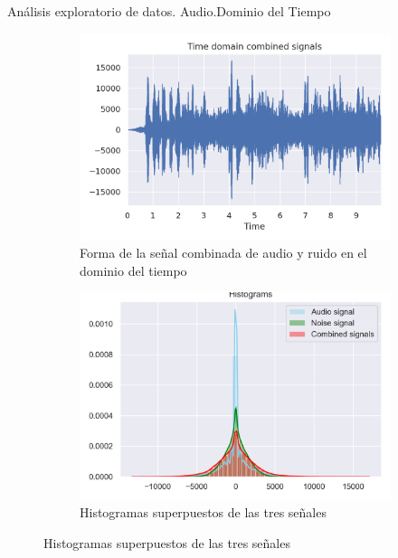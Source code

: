 \begin{frame}{Análisis exploratorio de datos. Audio.\newline Dominio del Tiempo}
\begin{figure}
	\end{figure}
	\vspace*{-15pt}
	\begin{figure}
		\centering
		\begin{subfigure}[t]{0.5\textwidth}
			\centering
			\includegraphics[width=\columnwidth]{../figures/combination_time.png}
			\vspace*{-10pt}
			\caption{Forma de la señal combinada de audio y ruido en el dominio del tiempo}
			\label{fig: combination_time}
		\end{subfigure}%
		\hspace*{10pt}
		\begin{subfigure}[t]{0.5\textwidth}
			\centering
			\includegraphics[width=\columnwidth]{../figures/hist_time.png}
			\vspace*{-10pt}
			\caption{Histogramas superpuestos de las tres señales}
			\label{fig: hist_time}
		\end{subfigure}
	\end{figure}
\end{frame}
